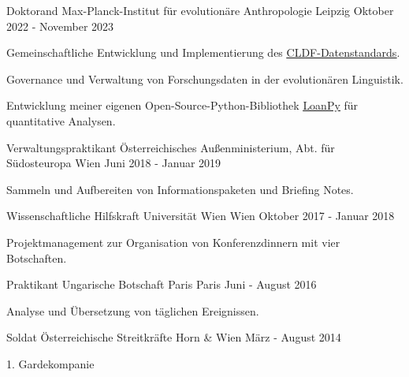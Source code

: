 \begin{cventries}

  \cventry
    {Doktorand} %
    {Max-Planck-Institut für evolutionäre Anthropologie} %
    {Leipzig} %
    {Oktober 2022 - November 2023} %
    {
      \begin{cvitems} %
      \item{Gemeinschaftliche Entwicklung und Implementierung des \underline{\href{https://cldf.clld.org/}{CLDF-Datenstandards}}.}
      \item{Governance und Verwaltung von Forschungsdaten in der evolutionären Linguistik.}
      \item{Entwicklung meiner eigenen Open-Source-Python-Bibliothek \underline{\href{https://pypi.org/project/loanpy/}{LoanPy}} für quantitative Analysen.}
      \end{cvitems}
    }
    
  \cventry
    {Verwaltungspraktikant} %
    {Österreichisches Außenministerium, Abt. für Südosteuropa} %
    {Wien} %
    {Juni 2018 - Januar 2019} %
    {
      \begin{cvitems} %
        \item{Sammeln und Aufbereiten von Informationspaketen und Briefing Notes.}
      \end{cvitems}
    }

  \cventry
    {Wissenschaftliche Hilfskraft} %
    {Universität Wien} %
    {Wien} %
    {Oktober 2017 - Januar 2018} %
    {
    \begin{cvitems}
    \item{Projektmanagement zur Organisation von Konferenzdinnern mit vier Botschaften.}
    \end{cvitems}
    }
    
  \cventry
    {Praktikant} %
    {Ungarische Botschaft Paris} %
    {Paris} %
    {Juni - August 2016} %
    {
    \begin{cvitems}
    \item{Analyse und Übersetzung von täglichen Ereignissen.}
    \end{cvitems}
    }

  \cventry
    {Soldat} %
    {Österreichische Streitkräfte} %
    {Horn \& Wien} %
    {März - August 2014} %
    {
    \begin{cvitems}
    \item{1. Gardekompanie}
    \end{cvitems}
    }
        
\end{cventries}
